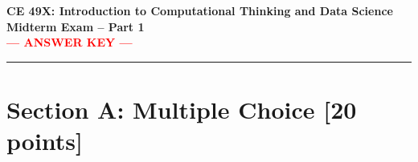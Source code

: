 \documentclass[11pt,a4paper]{article}
\begin{document}
\begin{center}
\Large\textbf{CE 49X: Introduction to Computational Thinking and Data Science}\\[0.1cm]
\large\textbf{Midterm Exam -- Part 1}\\[0.05cm]
\large\textcolor{red}{\textbf{--- ANSWER KEY ---}}\\[0.2cm]
\end{center}

\noindent\rule{\linewidth}{1pt}
\vspace{0.2cm}

\section*{Section A: Multiple Choice [20 points]}
\end{document}
